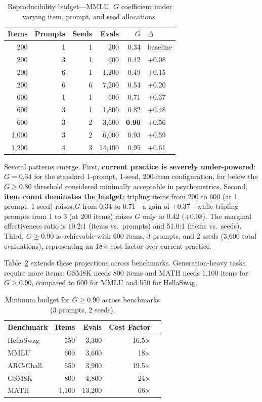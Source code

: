 \documentclass[letterpaper,11pt]{article}
\begin{document}
\begin{table}[t]
\centering
\caption{Reproducibility budget---MMLU. $G$ coefficient under varying item, prompt, and seed allocations.}
\label{tab:dstudy_budget}
\small
\begin{tabular}{rrrrrl}
\toprule
Items & Prompts & Seeds & Evals & $G$ & $\Delta$ \\
\midrule
200 & 1 & 1 & 200 & 0.34 & baseline \\
200 & 3 & 1 & 600 & 0.42 & +0.08 \\
200 & 6 & 1 & 1,200 & 0.49 & +0.15 \\
200 & 6 & 6 & 7,200 & 0.54 & +0.20 \\
600 & 1 & 1 & 600 & 0.71 & +0.37 \\
600 & 3 & 1 & 1,800 & 0.82 & +0.48 \\
600 & 3 & 2 & 3,600 & \textbf{0.90} & +0.56 \\
1,000 & 3 & 2 & 6,000 & 0.93 & +0.59 \\
1,200 & 4 & 3 & 14,400 & 0.95 & +0.61 \\
\bottomrule
\end{tabular}
\end{table}

Several patterns emerge.
First, \textbf{current practice is severely under-powered}: $G = 0.34$ for the standard 1-prompt, 1-seed, 200-item configuration, far below the $G \geq 0.80$ threshold considered minimally acceptable in psychometrics.
Second, \textbf{item count dominates the budget}: tripling items from 200 to 600 (at 1 prompt, 1 seed) raises $G$ from 0.34 to 0.71---a gain of +0.37---while tripling prompts from 1 to 3 (at 200 items) raises $G$ only to 0.42 (+0.08).
The marginal effectiveness ratio is 10.2:1 (items vs.\ prompts) and 51.0:1 (items vs.\ seeds).
Third, $G \geq 0.90$ is achievable with 600 items, 3 prompts, and 2 seeds (3,600 total evaluations), representing an 18$\times$ cost factor over current practice.

Table~\ref{tab:cross_benchmark_budget} extends these projections across benchmarks.
Generation-heavy tasks require more items: GSM8K needs 800 items and MATH needs 1,100 items for $G \geq 0.90$, compared to 600 for MMLU and 550 for HellaSwag.

\begin{table}[t]
\centering
\caption{Minimum budget for $G \geq 0.90$ across benchmarks (3 prompts, 2 seeds).}
\label{tab:cross_benchmark_budget}
\small
\begin{tabular}{lrrrl}
\toprule
Benchmark & Items & Evals & Cost Factor \\
\midrule
HellaSwag & 550 & 3,300 & 16.5$\times$ \\
MMLU & 600 & 3,600 & 18$\times$ \\
ARC-Chall. & 650 & 3,900 & 19.5$\times$ \\
GSM8K & 800 & 4,800 & 24$\times$ \\
MATH & 1,100 & 13,200 & 66$\times$ \\
\bottomrule
\end{tabular}
\end{table}
\end{document}
